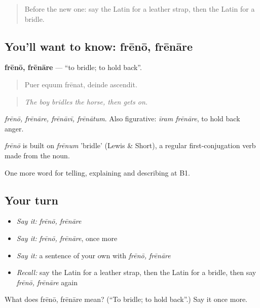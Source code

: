 \begin{quote}
Before the new one: say the Latin for a leather strap, then the Latin for a bridle.
\end{quote}

\subsection*{You'll want to know: frēnō, frēnāre}
\textbf{frēnō, frēnāre} — \textquotedblleft{}to bridle; to hold back\textquotedblright{}.

\begin{quote}
Puer equum frēnat, deinde ascendit.
\end{quote}

\begin{quote}
\emph{The boy bridles the horse, then gets on.}
\end{quote}

\emph{frēnō, frēnāre, frēnāvī, frēnātum}. Also figurative: \emph{īram frēnāre}, to hold back anger.

\begin{cousinweb}
\emph{frēnō} is built on \emph{frēnum} 'bridle' (Lewis \& Short), a regular first-conjugation verb made from the noun.
\end{cousinweb}

\begin{grammarlens}[title={What you've built}]
One more word for telling, explaining and describing at B1.
\end{grammarlens}

\subsection*{Your turn}
\begin{itemize}
\raggedright
  \item \emph{Say it:} \emph{frēnō, frēnāre}
  \item \emph{Say it:} \emph{frēnō, frēnāre}, once more
  \item \emph{Say it:} a sentence of your own with \emph{frēnō, frēnāre}
  \item \emph{Recall:} say the Latin for a leather strap, then the Latin for a bridle, then say \emph{frēnō, frēnāre} again
\end{itemize}

\begin{tcolorbox}[breakable,colback=teal!4,colframe=teal!35!black,title={Before you move on}]
What does frēnō, frēnāre mean? (\textquotedblleft{}To bridle; to hold back\textquotedblright{}.) Say it once more.
\end{tcolorbox}
